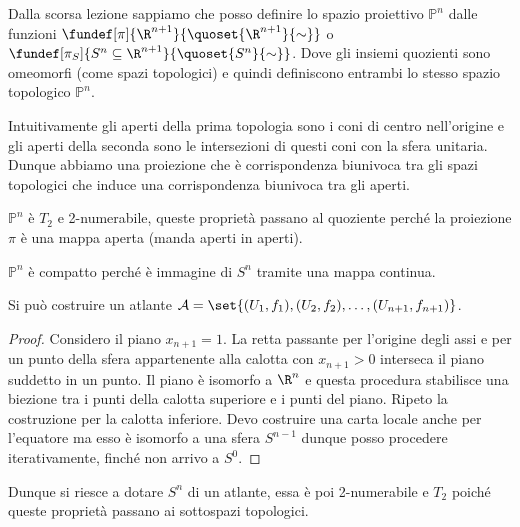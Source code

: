

\begin{defn}
Dalla scorsa lezione sappiamo che posso definire lo spazio proiettivo 
$\mathbb{P}^n$ dalle funzioni $\fundef[\pi]{\R^{n+1}}{\quoset {\R^{n+1}}{\sim}}$ o $\fundef[\pi_S]{S^n \subseteq \R^{n+1}}{\quoset {S^{n}}{\sim}}$. Dove gli insiemi quozienti sono omeomorfi (come spazi topologici) e quindi definiscono entrambi lo stesso spazio topologico $\mathbb{P}^{n}$.
\end{defn}
\begin{oss}
Intuitivamente gli aperti della prima topologia sono i coni di centro nell'origine e gli aperti della seconda sono le intersezioni di questi coni con la sfera unitaria. Dunque abbiamo una proiezione che è corrispondenza biunivoca tra gli spazi topologici che induce una corrispondenza biunivoca tra gli aperti.
\end{oss}
\begin{oss}
$\mathbb{P}^{n}$ è $T_{2}$ e 2-numerabile, queste proprietà passano al quoziente perché la proiezione $\pi$ è una mappa aperta (manda aperti in aperti).
\end{oss}
\begin{oss}
$\mathbb{P}^{n}$ è compatto perché è immagine di $S^{n}$ tramite una mappa continua.
\end{oss}


\begin{prop}
Si può costruire un atlante $\mathcal{A} = \set{{(U_1, f_1), (U_2, f_2), \dots, (U_{n+1}, f_{n+1})}}$.
\end{prop}
\begin{proof}
Considero il piano $x_{n+1} = 1$. La retta passante per l'origine degli assi e per un punto della sfera appartenente alla calotta con $x_{n+1} > 0$ interseca il piano suddetto in un punto. Il piano è isomorfo a $\R^n$ e questa procedura stabilisce una biezione tra i punti della calotta superiore e i punti del piano. Ripeto la costruzione per la calotta inferiore. 
Devo costruire una carta locale anche per l'equatore ma esso è isomorfo a una sfera $S^{n-1}$ dunque posso procedere iterativamente, finché non arrivo a $S^{0}$. 
\end{proof}
Dunque si riesce a dotare $S^{n}$ di un atlante, essa è poi 2-numerabile e $T_{2}$ poiché queste proprietà passano ai sottospazi topologici.

